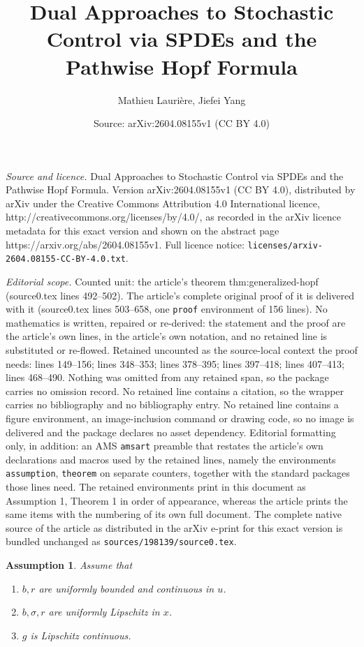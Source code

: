 \documentclass[10pt,a4paper]{amsart}
\title{Dual Approaches to Stochastic Control via SPDEs and the Pathwise Hopf Formula}
\author{Mathieu Lauri\`ere, Jiefei Yang}
\date{Source: arXiv:2604.08155v1 (CC BY 4.0)}
\newtheorem{assumption}{Assumption}
\begin{document}
\maketitle

\noindent\emph{Source and licence.} Dual Approaches to Stochastic Control via SPDEs and the Pathwise Hopf Formula. Version arXiv:2604.08155v1 (CC BY 4.0), distributed by arXiv under the Creative Commons Attribution 4.0 International licence, http://creativecommons.org/licenses/by/4.0/, as recorded in the arXiv licence metadata for this exact version and shown on the abstract page https://arxiv.org/abs/2604.08155v1. Full licence notice: \texttt{licenses/arxiv-2604.08155-CC-BY-4.0.txt}.\par\smallskip

\noindent\textit{Editorial scope.} Counted unit: the article's theorem thm:generalized-hopf (source0.tex lines 492--502). The article's complete original proof of it is delivered with it (source0.tex lines 503--658, one \texttt{proof} environment of 156 lines). No mathematics is written, repaired or re-derived: the statement and the proof are the article's own lines, in the article's own notation, and no retained line is substituted or re-flowed.  Retained uncounted as the source-local context the proof needs: lines 149--156; lines 348--353; lines 378--395; lines 397--418; lines 407--413; lines 468--490.  Nothing was omitted from any retained span, so the package carries no omission record.  No retained line contains a citation, so the wrapper carries no bibliography and no bibliography entry.  No retained line contains a figure environment, an image-inclusion command or drawing code, so no image is delivered and the package declares no asset dependency.  Editorial formatting only, in addition: an AMS \texttt{amsart} preamble that restates the article's own declarations and macros used by the retained lines, namely the environments \texttt{assumption}, \texttt{theorem} on separate counters, together with the standard packages those lines need.  The retained environments print in this document as Assumption 1, Theorem 1 in order of appearance, whereas the article prints the same items with the numbering of its own full document.  The complete native source of the article as distributed in the arXiv e-print for this exact version is bundled unchanged as \texttt{sources/198139/source0.tex}.
\begin{assumption} \label{assu:dual-sc-prob}
    Assume that 
    \begin{enumerate}
        \item $b, r$ are uniformly bounded and continuous in $u$. 
        \item $b, \sigma, r$ are uniformly Lipschitz in $x$. 
        \item $g$ is Lipschitz continuous. 
    \end{enumerate}
\end{assumption}
\end{document}
